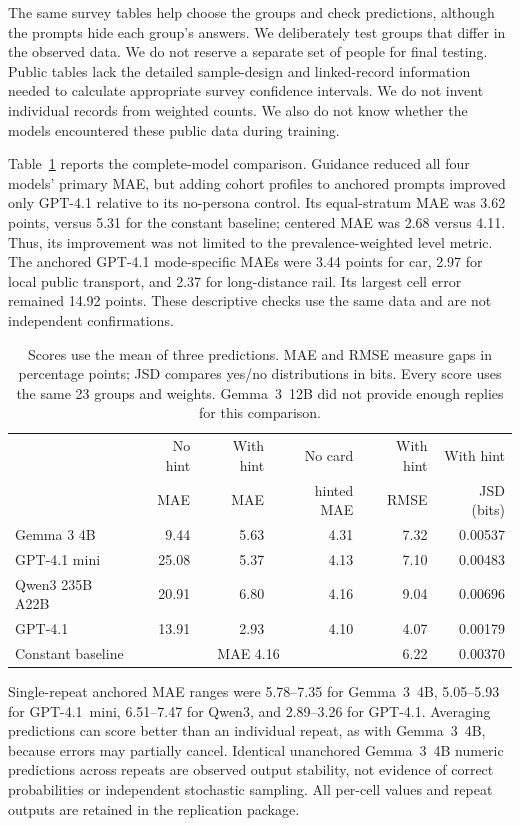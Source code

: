 \documentclass{article}
\begin{document}
The same survey tables help choose the groups and check predictions, although the prompts hide each group's answers. We deliberately test groups that differ in the observed data. We do not reserve a separate set of people for final testing. Public tables lack the detailed sample-design and linked-record information needed to calculate appropriate survey confidence intervals. We do not invent individual records from weighted counts. We also do not know whether the models encountered these public data during training.

Table~\ref{tab:metrics} reports the complete-model comparison. Guidance reduced all four models' primary MAE, but adding cohort profiles to anchored prompts improved only GPT-4.1 relative to its no-persona control. Its equal-stratum MAE was 3.62 points, versus 5.31 for the constant baseline; centered MAE was 2.68 versus 4.11. Thus, its improvement was not limited to the prevalence-weighted level metric. The anchored GPT-4.1 mode-specific MAEs were 3.44 points for car, 2.97 for local public transport, and 2.37 for long-distance rail. Its largest cell error remained 14.92 points. These descriptive checks use the same data and are not independent confirmations.

\begin{table}[htbp]
\centering\footnotesize
\begin{tabular}{lrrrrr}
\toprule
 & No hint & With hint & No card & With hint & With hint\\
 & MAE & MAE & hinted MAE & RMSE & JSD (bits)\\
\midrule
Gemma 3 4B & 9.44 & 5.63 & 4.31 & 7.32 & 0.00537\\
GPT-4.1 mini & 25.08 & 5.37 & 4.13 & 7.10 & 0.00483\\
Qwen3 235B A22B & 20.91 & 6.80 & 4.16 & 9.04 & 0.00696\\
GPT-4.1 & 13.91 & 2.93 & 4.10 & 4.07 & 0.00179\\
\midrule
Constant baseline & \multicolumn{3}{c}{MAE 4.16} & 6.22 & 0.00370\\
\bottomrule
\end{tabular}
\caption{Scores use the mean of three predictions. MAE and RMSE measure gaps in percentage points; JSD compares yes/no distributions in bits. Every score uses the same 23 groups and weights. Gemma~3~12B did not provide enough replies for this comparison.}
\label{tab:metrics}
\end{table}

Single-repeat anchored MAE ranges were 5.78--7.35 for Gemma~3~4B, 5.05--5.93 for GPT-4.1~mini, 6.51--7.47 for Qwen3, and 2.89--3.26 for GPT-4.1. Averaging predictions can score better than an individual repeat, as with Gemma~3~4B, because errors may partially cancel. Identical unanchored Gemma~3~4B numeric predictions across repeats are observed output stability, not evidence of correct probabilities or independent stochastic sampling. All per-cell values and repeat outputs are retained in the replication package.
\end{document}
